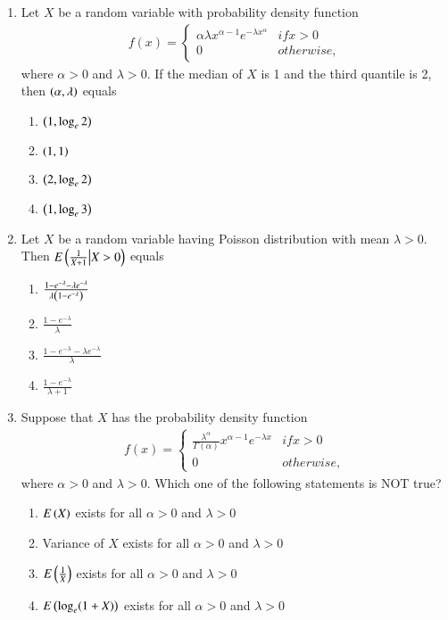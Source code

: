 \documentclass[journal]{IEEEtran}
\begin{document}
\begin{enumerate}
\item Let $ X $ be a random variable with probability density function
\begin{align*}
    f(x) = \begin{cases} 
      \alpha \lambda x^{\alpha -1} e^{-\lambda x^{\alpha}} & if x > 0 \\ 
      0 & otherwise, 
   \end{cases}
\end{align*}
where $ \alpha > 0 $ and $ \lambda > 0 $. If the median of $ X $ is 1 and the third quantile is 2, then $ \left(\alpha, \lambda\right) $ equals
\begin{enumerate}
    \item $\left(1,  \log_e 2 \right)$
    \item $\left(1, 1\right)$
    \item $\left(2,  \log_e 2 \right)$
    \item $\left(1,  \log_e 3 \right)$
\end{enumerate}

\item Let $ X $ be a random variable having Poisson distribution with mean $ \lambda > 0 $. Then
$E \left(\frac{1}{X+1}\middle|X > 0\right)$ equals
\begin{enumerate}
    \item $ \frac{1 - e^{-\lambda} - \lambda e^{-\lambda}}{\lambda \left(1- e^{-\lambda}\right)} $
    \item $ \frac{1-e^{-\lambda}}{\lambda} $
    \item $ \frac{1 - e^{-\lambda} - \lambda e^{-\lambda}}{\lambda } $
    \item $ \frac{1-e^{-\lambda}}{\lambda+1} $
\end{enumerate}

\item Suppose that $ X $ has the probability density function
\begin{align*}
    f(x) = \begin{cases} 
      \frac{\lambda^{\alpha}}{\Gamma(\alpha)} x^{\alpha - 1} e^{-\lambda x} & if  x > 0 \\ 
      0 & otherwise, 
   \end{cases}
\end{align*}
where $ \alpha > 0 $ and $ \lambda > 0 $. Which one of the following statements is NOT true?
\begin{enumerate}
    \item $ E\left(X\right)$ exists for all $ \alpha > 0 $ and $ \lambda > 0 $
    \item Variance of $ X $ exists for all $ \alpha > 0 $ and $ \lambda > 0 $
    \item $ E\left(\frac{1}{X} \right) $ exists for all $ \alpha > 0 $ and $ \lambda > 0 $
    \item $ E\left(\log_e (1 + X)\right)$ exists for all $ \alpha > 0 $ and $ \lambda > 0 $
\end{enumerate}


\end{enumerate}
\end{document}
